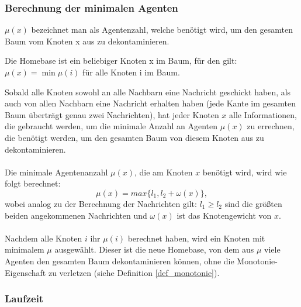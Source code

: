 \subsubsection{Berechnung der minimalen Agenten}

\begin{mydef}
	$\mu(x)$ bezeichnet man als Agentenzahl, welche benötigt wird, um den gesamten Baum vom Knoten x aus zu dekontaminieren. 
\end{mydef}

\begin{mydef}\label{def_homebase}
	Die Homebase ist ein beliebiger Knoten x im Baum, für den gilt: $\mu(x) = \min \mu(i)$ für alle Knoten i im Baum.
\end{mydef}

Sobald alle Knoten sowohl an alle Nachbarn eine Nachricht geschickt haben, als auch von allen Nachbarn eine Nachricht erhalten haben (jede Kante im gesamten Baum überträgt genau zwei Nachrichten), hat jeder Knoten $x$ alle Informationen, die gebraucht werden, um die minimale Anzahl an Agenten $\mu(x)$ zu errechnen, die benötigt werden, um den gesamten Baum von diesem Knoten aus zu dekontaminieren.
\\
\\
Die minimale Agentenanzahl $\mu(x)$, die am Knoten $x$ benötigt wird, wird wie folgt berechnet:
$$\mu(x) = max\{l_{1},  l_{2} + \omega(x)\},$$ wobei analog zu der Berechnung der Nachrichten gilt: $l_{1} \ge l_{2}$ sind die größten beiden angekommenen Nachrichten und $\omega(x)$ ist das Knotengewicht von $x$.
\\
\\
Nachdem alle Knoten $i$ ihr $\mu(i)$ berechnet haben, wird ein Knoten mit minimalem $\mu$ ausgewählt. Dieser ist die neue Homebase, von dem aus $\mu$ viele Agenten den gesamten Baum dekontaminieren können, ohne die Monotonie-Eigenschaft zu verletzen (siehe Definition \ref{def_monotonie}).


\subsubsection{Laufzeit}

